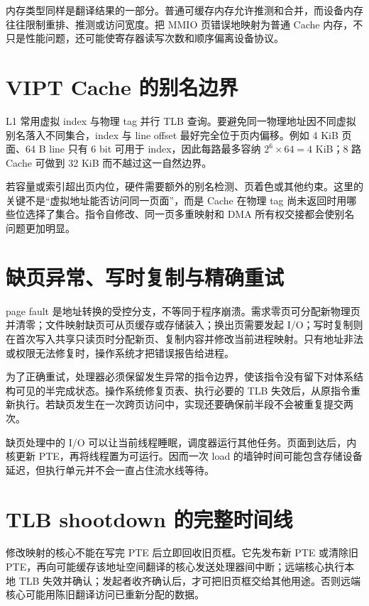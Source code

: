 内存类型同样是翻译结果的一部分。普通可缓存内存允许推测和合并，而设备内存往往限制重排、推测或访问宽度。把 MMIO 页错误地映射为普通 Cache 内存，不只是性能问题，还可能使寄存器读写次数和顺序偏离设备协议。

\section{VIPT Cache 的别名边界}

L1 常用虚拟 index 与物理 tag 并行 TLB 查询。要避免同一物理地址因不同虚拟别名落入不同集合，index 与 line offset 最好完全位于页内偏移。例如 4 KiB 页面、64 B line 只有 6 bit 可用于 index，因此每路最多容纳 $2^6\times64=4$ KiB；8 路 Cache 可做到 32 KiB 而不越过这一自然边界。

若容量或索引超出页内位，硬件需要额外的别名检测、页着色或其他约束。这里的关键不是“虚拟地址能否访问同一页面”，而是 Cache 在物理 tag 尚未返回时用哪些位选择了集合。指令自修改、同一页多重映射和 DMA 所有权交接都会使别名问题更加明显。

\section{缺页异常、写时复制与精确重试}

page fault 是地址转换的受控分支，不等同于程序崩溃。需求零页可分配新物理页并清零；文件映射缺页可从页缓存或存储装入；换出页需要发起 I/O；写时复制则在首次写入共享只读页时分配新页、复制内容并修改当前进程映射。只有地址非法或权限无法修复时，操作系统才把错误报告给进程。

为了正确重试，处理器必须保留发生异常的指令边界，使该指令没有留下对体系结构可见的半完成状态。操作系统修复页表、执行必要的 TLB 失效后，从原指令重新执行。若缺页发生在一次跨页访问中，实现还要确保前半段不会被重复提交两次。

缺页处理中的 I/O 可以让当前线程睡眠，调度器运行其他任务。页面到达后，内核更新 PTE，再将线程置为可运行。因而一次 load 的墙钟时间可能包含存储设备延迟，但执行单元并不会一直占住流水线等待。

\section{TLB shootdown 的完整时间线}

修改映射的核心不能在写完 PTE 后立即回收旧页框。它先发布新 PTE 或清除旧 PTE，再向可能缓存该地址空间翻译的核心发送处理器间中断；远端核心执行本地 TLB 失效并确认；发起者收齐确认后，才可把旧页框交给其他用途。否则远端核心可能用陈旧翻译访问已重新分配的数据。

